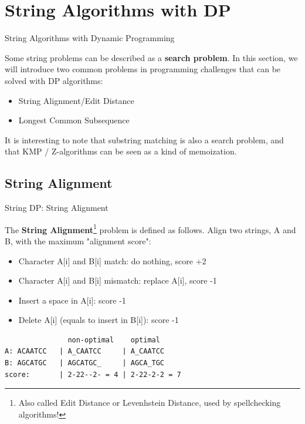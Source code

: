 \section{String Algorithms with DP} %
\begin{frame}{String Algorithms with Dynamic Programming}
  \begin{block}{}
    Some string problems can be described as a {\bf search problem}. In this section, we will introduce two common problems in programming challenges that can be solved with DP algorithms:\bigskip

    \begin{itemize}
    \item String Alignment/Edit Distance
    \item Longest Common Subsequence
    \end{itemize}
  \end{block}
  \bigskip

  It is interesting to note that substring matching is also a search problem, and that KMP / Z-algorithms can be seen as a kind of memoization.
\end{frame}

\subsection{String Alignment}
\begin{frame}[fragile]{String DP: String Alignment}

The {\bf String Alignment}\footnote{Also called Edit Distance or Levenhstein Distance, used by spellchecking algorithms!} problem is defined as follows. Align two strings, A and B, with the maximum "alignment score":\bigskip

\begin{itemize}
  \item Character A[i] and B[i] match: do nothing, score +2
  \item Character A[i] and B[i] mismatch: replace A[i], score -1
  \item Insert a space in A[i]: score -1
  \item Delete A[i] (equals to insert in B[i]): score -1
\end{itemize}

\begin{verbatim}
               non-optimal    optimal
A: ACAATCC   | A_CAATCC     | A_CAATCC
B: AGCATGC   | AGCATGC_     | AGCA_TGC
score:       | 2-22--2- = 4 | 2-22-2-2 = 7
\end{verbatim}\bigskip

\end{frame}


